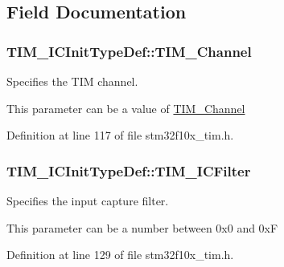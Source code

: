 \subsection{Field Documentation}
\hypertarget{struct_t_i_m___i_c_init_type_def_ab9404ee3d95aaa7a478ed99562c736d2}{
\subsubsection[{T\-I\-M\-\_\-\-Channel}]{ T\-I\-M\-\_\-\-I\-C\-Init\-Type\-Def\-::\-T\-I\-M\-\_\-\-Channel}}\label{struct_t_i_m___i_c_init_type_def_ab9404ee3d95aaa7a478ed99562c736d2}
\begin{DoxyVerb}      Specifies the TIM channel.
\end{DoxyVerb}
 This parameter can be a value of \hyperlink{group___t_i_m___channel}{T\-I\-M\-\_\-\-Channel} 

Definition at line 117 of file stm32f10x\-\_\-tim.\-h.

\hypertarget{struct_t_i_m___i_c_init_type_def_a72539caa6e965e4fa89e3b21b188cf26}{
\subsubsection[{T\-I\-M\-\_\-\-I\-C\-Filter}]{ T\-I\-M\-\_\-\-I\-C\-Init\-Type\-Def\-::\-T\-I\-M\-\_\-\-I\-C\-Filter}}\label{struct_t_i_m___i_c_init_type_def_a72539caa6e965e4fa89e3b21b188cf26}
\begin{DoxyVerb}     Specifies the input capture filter.
\end{DoxyVerb}
 This parameter can be a number between 0x0 and 0x\-F 

Definition at line 129 of file stm32f10x\-\_\-tim.\-h.

